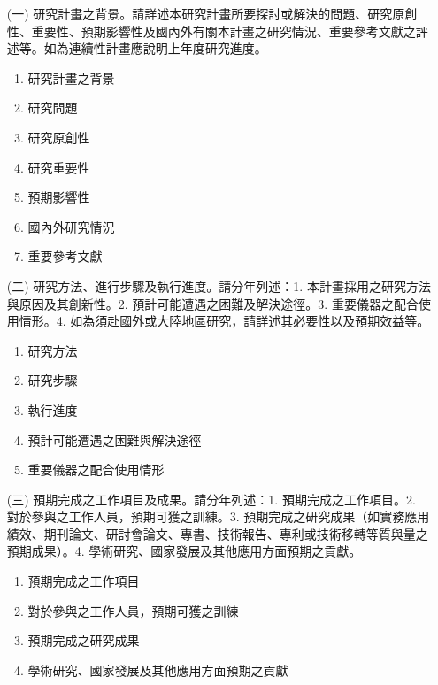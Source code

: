 \documentclass[12pt,a4paper]{article}
\begin{document}

\begin{enumerate}
\item[(一)] 研究計畫之背景。請詳述本研究計畫所要探討或解決的問題、研究原創性、重要性、預期影響性及國內外有關本計畫之研究情況、重要參考文獻之評述等。如為連續性計畫應說明上年度研究進度。
\begin{enumerate}[label=\arabic*.]
\item 研究計畫之背景\\
\item 研究問題\\
\item 研究原創性\\
\item 研究重要性\\
\item 預期影響性\\
\item 國內外研究情況\\
\item 重要參考文獻\\
\end{enumerate}

\item[(二)] 研究方法、進行步驟及執行進度。請分年列述：1. 本計畫採用之研究方法與原因及其創新性。2. 預計可能遭遇之困難及解決途徑。3. 重要儀器之配合使用情形。4. 如為須赴國外或大陸地區研究，請詳述其必要性以及預期效益等。
\begin{enumerate}[label=\arabic*.]
\item 研究方法\\
\item 研究步驟\\
\item 執行進度\\
\item 預計可能遭遇之困難與解決途徑\\
\item 重要儀器之配合使用情形\\
\end{enumerate}

\item[(三)] 預期完成之工作項目及成果。請分年列述：1. 預期完成之工作項目。2. 對於參與之工作人員，預期可獲之訓練。3. 預期完成之研究成果（如實務應用績效、期刊論文、研討會論文、專書、技術報告、專利或技術移轉等質與量之預期成果）。4. 學術研究、國家發展及其他應用方面預期之貢獻。
\begin{enumerate}[label=\arabic*.]
\item 預期完成之工作項目\\
\item 對於參與之工作人員，預期可獲之訓練\\
\item 預期完成之研究成果\\
\item 學術研究、國家發展及其他應用方面預期之貢獻\\
\end{enumerate}

\end{enumerate}	

\label{LastPage}
\end{document}
